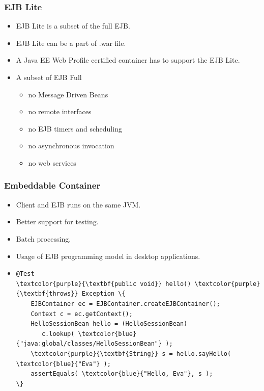 \documentclass[10pt,xcolor=pdflatex]{beamer}
\begin{document}
\begin{frame}\frametitle{EJB Lite}
	\begin{itemize}
		\item EJB Lite is a subset of the full EJB.
		\item EJB Lite can be a part of .war file.
        \item A Java EE Web Profile certified container has to support the EJB Lite.
		\item A subset of EJB Full
          \begin{itemize}
        	\item no Message Driven Beans
        	\item no remote interfaces
        	\item no EJB timers and scheduling
        	\item no asynchronous invocation
        	\item no web services
          \end{itemize}
	\end{itemize}
\end{frame}


\begin{frame}[fragile]\frametitle{Embeddable Container}
	\begin{itemize}
		\item Client and EJB runs on the same JVM.
		\item Better support for testing.
		\item Batch processing.
		\item Usage of EJB programming model in desktop applications.
		\item[]
        	\medskip
            \begin{Verbatim}[fontsize=\footnotesize, commandchars=\\\{\}]
@Test
\textcolor{purple}{\textbf{public void}} hello() \textcolor{purple}{\textbf{throws}} Exception \{
    EJBContainer ec = EJBContainer.createEJBContainer();
    Context c = ec.getContext();
    HelloSessionBean hello = (HelloSessionBean)
       c.lookup( \textcolor{blue}{"java:global/classes/HelloSessionBean"} );
    \textcolor{purple}{\textbf{String}} s = hello.sayHello( \textcolor{blue}{"Eva"} );
    assertEquals( \textcolor{blue}{"Hello, Eva"}, s );
\}
			\end{Verbatim}
	\end{itemize}
\end{frame}
\end{document}
